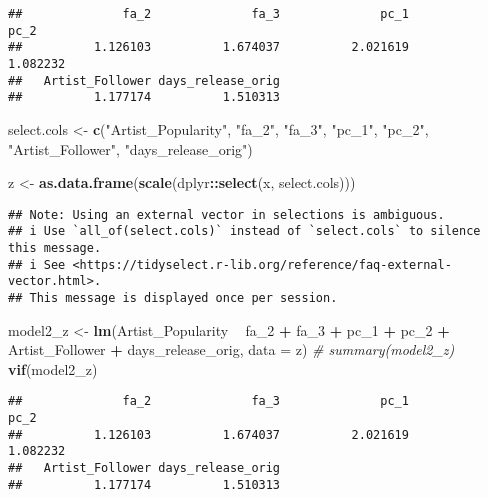 \documentclass[
]{article}
\newenvironment{Shaded}{\begin{snugshade}}{\end{snugshade}}
\newcommand{\CommentTok}[1]{\textcolor[rgb]{0.56,0.35,0.01}{\textit{#1}}}
\newcommand{\DataTypeTok}[1]{\textcolor[rgb]{0.13,0.29,0.53}{#1}}
\newcommand{\DecValTok}[1]{\textcolor[rgb]{0.00,0.00,0.81}{#1}}
\newcommand{\KeywordTok}[1]{\textcolor[rgb]{0.13,0.29,0.53}{\textbf{#1}}}
\newcommand{\NormalTok}[1]{#1}
\newcommand{\OperatorTok}[1]{\textcolor[rgb]{0.81,0.36,0.00}{\textbf{#1}}}
\newcommand{\StringTok}[1]{\textcolor[rgb]{0.31,0.60,0.02}{#1}}
\begin{document}
\begin{verbatim}
##              fa_2              fa_3              pc_1              pc_2 
##          1.126103          1.674037          2.021619          1.082232 
##   Artist_Follower days_release_orig 
##          1.177174          1.510313
\end{verbatim}

\begin{Shaded}
\begin{Highlighting}[]
\NormalTok{select.cols <-}\StringTok{ }\KeywordTok{c}\NormalTok{(}\StringTok{"Artist_Popularity"}\NormalTok{, }\StringTok{"fa_2"}\NormalTok{, }\StringTok{"fa_3"}\NormalTok{, }\StringTok{"pc_1"}\NormalTok{, }\StringTok{"pc_2"}\NormalTok{, }\StringTok{"Artist_Follower"}\NormalTok{, }\StringTok{"days_release_orig"}\NormalTok{)}

\NormalTok{z <-}\StringTok{ }\KeywordTok{as.data.frame}\NormalTok{(}\KeywordTok{scale}\NormalTok{(dplyr}\OperatorTok{::}\KeywordTok{select}\NormalTok{(x, select.cols)))}
\end{Highlighting}
\end{Shaded}

\begin{verbatim}
## Note: Using an external vector in selections is ambiguous.
## i Use `all_of(select.cols)` instead of `select.cols` to silence this message.
## i See <https://tidyselect.r-lib.org/reference/faq-external-vector.html>.
## This message is displayed once per session.
\end{verbatim}

\begin{Shaded}
\begin{Highlighting}[]
\NormalTok{model2_z <-}\StringTok{ }\KeywordTok{lm}\NormalTok{(Artist_Popularity }\OperatorTok{~}\StringTok{ }\NormalTok{fa_}\DecValTok{2} \OperatorTok{+}\StringTok{ }\NormalTok{fa_}\DecValTok{3} \OperatorTok{+}\StringTok{ }\NormalTok{pc_}\DecValTok{1} \OperatorTok{+}\StringTok{ }\NormalTok{pc_}\DecValTok{2} \OperatorTok{+}\StringTok{ }\NormalTok{Artist_Follower }\OperatorTok{+}\StringTok{ }\NormalTok{days_release_orig, }\DataTypeTok{data =}\NormalTok{ z)}
\CommentTok{# summary(model2_z)}
\KeywordTok{vif}\NormalTok{(model2_z)}
\end{Highlighting}
\end{Shaded}

\begin{verbatim}
##              fa_2              fa_3              pc_1              pc_2 
##          1.126103          1.674037          2.021619          1.082232 
##   Artist_Follower days_release_orig 
##          1.177174          1.510313
\end{verbatim}
\end{document}
